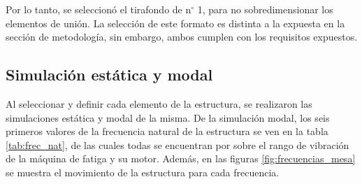 \begin{table}[h]
\centering
{}
\caption{Esfuerzos admisibles y factor de seguridad para distintas longitudes de tirafondo.}
\label{tab:res_tirafondos}
\end{table}

Por lo tanto, se seleccionó el tirafondo de n$^{\circ}$ 1, para no sobredimensionar los elementos de unión. La selección de este formato es distinta a la expuesta en la sección de metodología, sin embargo, ambos cumplen con los requisitos expuestos. 


\subsection{Simulación estática y modal}

Al seleccionar y definir cada elemento de la estructura, se realizaron las simulaciones estática y modal de la misma. De la simulación modal, los seis primeros valores de la frecuencia natural de la estructura se ven en la tabla \ref{tab:frec_nat}, de las cuales todas se encuentran por sobre el rango de vibración de la máquina de fatiga y su motor. Además, en las figuras \ref{fig:frecuencias_mesa} se muestra el movimiento de la estructura para cada frecuencia.

